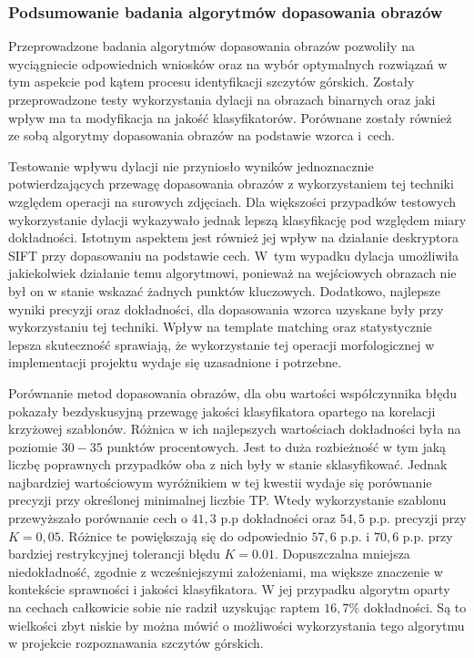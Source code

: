 \subsubsection{Podsumowanie badania algorytmów dopasowania obrazów}

Przeprowadzone badania algorytmów dopasowania obrazów pozwoliły na wyciągniecie odpowiednich wniosków oraz na wybór optymalnych rozwiązań w tym aspekcie pod kątem procesu identyfikacji szczytów górskich. Zostały przeprowadzone testy wykorzystania dylacji na obrazach binarnych oraz jaki wpływ ma ta modyfikacja na jakość klasyfikatorów. Porównane zostały również ze sobą algorytmy dopasowania obrazów na podstawie wzorca i~cech.


Testowanie wpływu dylacji nie przyniosło wyników jednoznacznie potwierdzających przewagę dopasowania obrazów z wykorzystaniem tej techniki względem operacji na surowych zdjęciach. Dla większości przypadków testowych wykorzystanie dylacji wykazywało jednak lepszą klasyfikację pod względem miary dokładności. Istotnym aspektem jest również jej wpływ na działanie deskryptora SIFT przy dopasowaniu na podstawie cech. W~tym wypadku dylacja umożliwiła jakiekolwiek działanie temu algorytmowi, ponieważ na wejściowych obrazach nie był on w stanie wskazać żadnych punktów kluczowych. 
Dodatkowo, najlepsze wyniki precyzji oraz dokładności, dla dopasowania wzorca uzyskane były przy wykorzystaniu tej techniki. Wpływ na template matching oraz statystycznie lepsza skuteczność sprawiają, że wykorzystanie tej operacji morfologicznej w implementacji projektu wydaje się uzasadnione i potrzebne. 

Porównanie metod dopasowania obrazów, dla obu wartości współczynnika błędu pokazały bezdyskusyjną przewagę jakości klasyfikatora opartego na korelacji krzyżowej szablonów. Różnica w ich najlepszych wartościach dokładności była na poziomie $30-35$ punktów procentowych. Jest to duża rozbieżność w tym jaką liczbę poprawnych przypadków oba z nich były w stanie sklasyfikować. Jednak najbardziej wartościowym wyróżnikiem w tej kwestii wydaje się porównanie precyzji przy określonej minimalnej liczbie TP. Wtedy wykorzystanie szablonu przewyższało porównanie cech o $41,3$ p.p dokładności oraz $54,5$ p.p. precyzji przy $K=0,05$. Różnice te powiększają się do odpowiednio $57,6$ p.p. i $70,6$ p.p. przy bardziej restrykcyjnej tolerancji błędu $K=0.01$. Dopuszczalna mniejsza niedokładność, zgodnie z wcześniejszymi założeniami, ma większe znaczenie w kontekście sprawności i jakości klasyfikatora. W jej przypadku algorytm oparty na cechach całkowicie sobie nie radził uzyskując raptem $16,7\%$ dokładności. Są to wielkości zbyt niskie by można mówić o możliwości wykorzystania tego algorytmu w projekcie rozpoznawania szczytów górskich.

